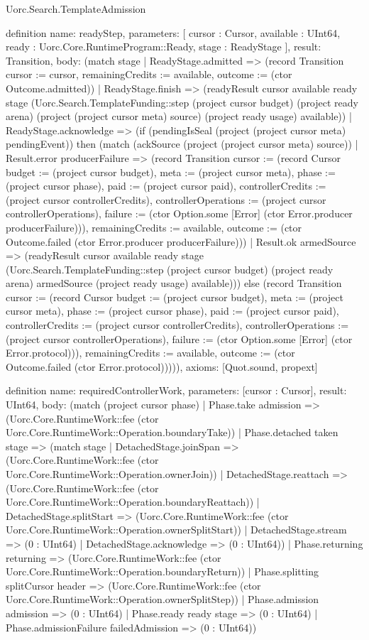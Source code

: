 \begin{lexlean}{Uorc.Search.TemplateAdmission}
\begin{semanticmodule}
definition{
  name: readyStep,
  parameters: [
    cursor : Cursor,
    available : UInt64,
    ready : Uorc.Core.RuntimeProgram::Ready,
    stage : ReadyStage
  ],
  result: Transition,
  body: (match stage
    | ReadyStage.admitted => (record Transition {cursor := cursor, remainingCredits := available, outcome := (ctor Outcome.admitted)})
    | ReadyStage.finish => (readyResult cursor available ready stage (Uorc.Search.TemplateFunding::step (project cursor budget) (project ready arena) (project (project cursor meta) source) (project ready usage) available))
    | ReadyStage.acknowledge => (if (pendingIsSeal (project (project cursor meta) pendingEvent)) then (match (ackSource (project (project cursor meta) source))
      | Result.error producerFailure => (record Transition {cursor := (record Cursor {budget := (project cursor budget), meta := (project cursor meta), phase := (project cursor phase), paid := (project cursor paid), controllerCredits := (project cursor controllerCredits), controllerOperations := (project cursor controllerOperations), failure := (ctor Option.some [Error] (ctor Error.producer producerFailure))}), remainingCredits := available, outcome := (ctor Outcome.failed (ctor Error.producer producerFailure))})
      | Result.ok armedSource => (readyResult cursor available ready stage (Uorc.Search.TemplateFunding::step (project cursor budget) (project ready arena) armedSource (project ready usage) available))) else (record Transition {cursor := (record Cursor {budget := (project cursor budget), meta := (project cursor meta), phase := (project cursor phase), paid := (project cursor paid), controllerCredits := (project cursor controllerCredits), controllerOperations := (project cursor controllerOperations), failure := (ctor Option.some [Error] (ctor Error.protocol))}), remainingCredits := available, outcome := (ctor Outcome.failed (ctor Error.protocol))}))),
  axioms: [Quot.sound, propext]
}

definition{
  name: requiredControllerWork,
  parameters: [cursor : Cursor],
  result: UInt64,
  body: (match (project cursor phase)
    | Phase.take admission => (Uorc.Core.RuntimeWork::fee (ctor Uorc.Core.RuntimeWork::Operation.boundaryTake))
    | Phase.detached taken stage => (match stage
      | DetachedStage.joinSpan => (Uorc.Core.RuntimeWork::fee (ctor Uorc.Core.RuntimeWork::Operation.ownerJoin))
      | DetachedStage.reattach => (Uorc.Core.RuntimeWork::fee (ctor Uorc.Core.RuntimeWork::Operation.boundaryReattach))
      | DetachedStage.splitStart => (Uorc.Core.RuntimeWork::fee (ctor Uorc.Core.RuntimeWork::Operation.ownerSplitStart))
      | DetachedStage.stream => (0 : UInt64)
      | DetachedStage.acknowledge => (0 : UInt64))
    | Phase.returning returning => (Uorc.Core.RuntimeWork::fee (ctor Uorc.Core.RuntimeWork::Operation.boundaryReturn))
    | Phase.splitting splitCursor header => (Uorc.Core.RuntimeWork::fee (ctor Uorc.Core.RuntimeWork::Operation.ownerSplitStep))
    | Phase.admission admission => (0 : UInt64)
    | Phase.ready ready stage => (0 : UInt64)
    | Phase.admissionFailure failedAdmission => (0 : UInt64))
}


\end{semanticmodule}
\end{lexlean}
